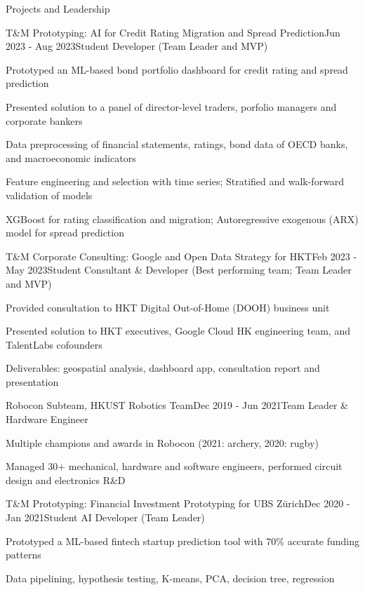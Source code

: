 \documentclass{resume}
\begin{document}
\begin{rSection}{Projects and Leadership}
    
    \begin{rSubsection}{T\&M Prototyping: AI for Credit Rating Migration and Spread Prediction}{Jun 2023 - Aug 2023}{Student Developer (Team Leader and MVP)}{}
        \item Prototyped an ML-based bond portfolio dashboard for credit rating and spread prediction 
        \item Presented solution to a panel of director-level traders, porfolio managers and corporate bankers
        \item Data preprocessing of financial statements, ratings, bond data of OECD banks, and macroeconomic indicators
        \item Feature engineering and selection with time series; Stratified and walk-forward validation of models
        \item XGBoost for rating classification and migration; Autoregressive exogenous (ARX) model for spread prediction
    \end{rSubsection}
    
    \begin{rSubsection}{T\&M Corporate Consulting: Google and Open Data Strategy for HKT}{Feb 2023 - May 2023}{Student Consultant \& Developer (Best performing team; Team Leader and MVP)}{}
        \item Provided consultation to HKT Digital Out-of-Home (DOOH) business unit
        \item Presented solution to HKT executives, Google Cloud HK engineering team, and TalentLabs cofounders
        \item Deliverables: geospatial analysis, dashboard app, consultation report and presentation
    \end{rSubsection}

    \begin{rSubsection}{Robocon Subteam, HKUST Robotics Team}{Dec 2019 - Jun 2021}{Team Leader \& Hardware Engineer}{}
        \item Multiple champions and awards in Robocon (2021: archery, 2020: rugby)
        \item Managed 30+ mechanical, hardware and software engineers, performed circuit design and electronics R\&D
    \end{rSubsection}

    \begin{rSubsection}{T\&M Prototyping: Financial Investment Prototyping for UBS Zürich}{Dec 2020 - Jan 2021}{Student AI Developer (Team Leader)}{}
        \item Prototyped a ML-based fintech startup prediction tool with 70\% accurate funding patterns
        \item Data pipelining, hypothesis testing, K-means, PCA, decision tree, regression
    \end{rSubsection}

\end{rSection}
\end{document}
